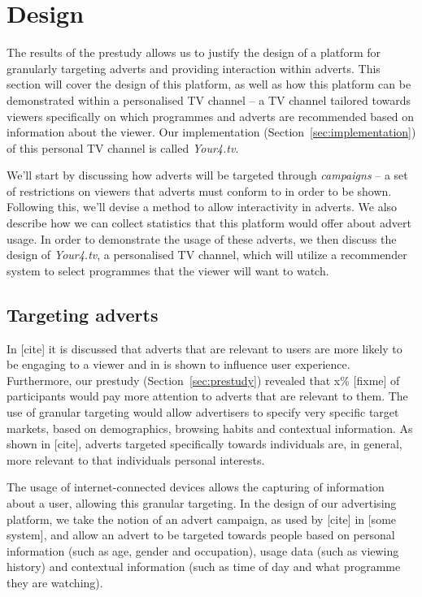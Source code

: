 \section{Design}

The results of the prestudy allows us to justify the design of a platform for granularly targeting adverts and providing interaction within adverts. This section will cover the design of this platform, as well as how this platform can be demonstrated within a personalised TV channel -- a TV channel tailored towards viewers specifically on which programmes and adverts are recommended based on information about the viewer. Our implementation (Section~\ref{sec:implementation}) of this personal TV channel is called \textit{Your4.tv}.

We'll start by discussing how adverts will be targeted through \textit{campaigns} -- a set of restrictions on viewers that adverts must conform to in order to be shown. Following this, we'll devise a method to allow interactivity in adverts. We also describe how we can collect statistics that this platform would offer about advert usage. In order to demonstrate the usage of these adverts, we then discuss the design of \textit{Your4.tv}, a personalised TV channel, which will utilize a recommender system to select programmes that the viewer will want to watch. 

\subsection{Targeting adverts}
	\label{sec:design_adverts}

	In [cite] it is discussed that adverts that are relevant to users are more likely to be engaging to a viewer and in \citet{yahoo-intrusive-advertising} is shown to influence user experience. Furthermore, our prestudy (Section~\ref{sec:prestudy}) revealed that x\% [fixme] of participants would pay more attention to adverts that are relevant to them. The use of granular targeting would allow advertisers to specify very specific target markets, based on demographics, browsing habits and contextual information. As shown in [cite], adverts targeted specifically towards individuals are, in general, more relevant to that individuals personal interests.

	The usage of internet-connected devices allows the capturing of information about a user, allowing this granular targeting. In the design of our advertising platform, we take the notion of an advert campaign, as used by [cite] in [some system], and allow an advert to be targeted towards people based on personal information (such as age, gender and occupation), usage data (such as viewing history) and contextual information (such as time of day and what programme they are watching).

